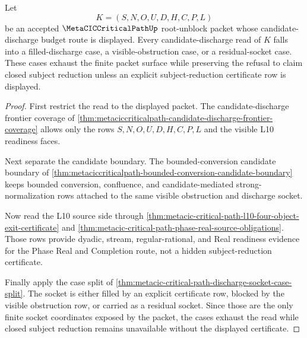 \begin{theorem}
\label{thm:metacic-critical-path-subject-reduction-socket-case-exhaustion}
Let
$$
K=(S,N,O,U,D,H,C,P,L)
$$
be an accepted $\MetaCICCriticalPathUp$ root-unblock packet whose candidate-discharge budget route is displayed. Every candidate-discharge read of $K$ falls into a filled-discharge case, a visible-obstruction case, or a residual-socket case. These cases exhaust the finite packet surface while preserving the refusal to claim closed subject reduction unless an explicit subject-reduction certificate row is displayed.
\end{theorem}
\begin{proof}
First restrict the read to the displayed packet. The candidate-discharge frontier coverage of \autoref{thm:metaciccriticalpath-candidate-discharge-frontier-coverage} allows only the rows $S,N,O,U,D,H,C,P,L$ and the visible L10 readiness faces.

Next separate the candidate boundary. The bounded-conversion candidate boundary of \autoref{thm:metaciccriticalpath-bounded-conversion-candidate-boundary} keeps bounded conversion, confluence, and candidate-mediated strong-normalization rows attached to the same visible obstruction and discharge socket.

Now read the L10 source side through \autoref{thm:metacic-critical-path-l10-four-object-exit-certificate} and \autoref{thm:metacic-critical-path-phase-real-source-obligations}. Those rows provide dyadic, stream, regular-rational, and Real readiness evidence for the Phase Real and Completion route, not a hidden subject-reduction certificate.

Finally apply the case split of \autoref{thm:metacic-critical-path-discharge-socket-case-split}. The socket is either filled by an explicit certificate row, blocked by the visible obstruction row, or carried as a residual socket. Since those are the only finite socket coordinates exposed by the packet, the cases exhaust the read while closed subject reduction remains unavailable without the displayed certificate.
\end{proof}

